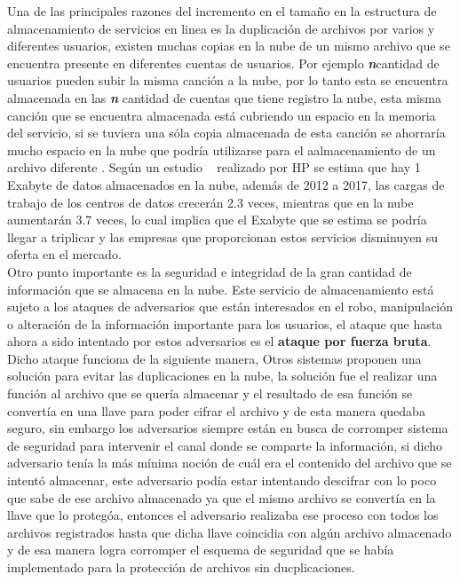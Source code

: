 Una de las principales razones del incremento en el tamaño en la estructura de almacenamiento de servicios en linea es la duplicación de archivos por varios y diferentes usuarios, existen muchas copias en la nube de un mismo archivo que se encuentra presente en diferentes cuentas de usuarios. Por ejemplo \textbf{\textit{n}}cantidad de  usuarios pueden subir la misma canción a la nube, por lo tanto esta se encuentra almacenada en las \textbf{\textit{n}} cantidad de cuentas que tiene registro la nube, esta misma canción que se encuentra almacenada está cubriendo un espacio en la memoria del servicio, si se tuviera una sóla copia almacenada de esta canción se ahorraría mucho espacio en la nube que podría utilizarse para el aalmacenamiento de un archivo diferente . Según un estudio ~\cite{popa} realizado por HP se estima que hay 1 Exabyte de datos almacenados en la nube, además de 2012 a 2017, las cargas de trabajo de los centros de datos crecerán 2.3 veces, mientras que en la nube aumentarán 3.7 veces, lo cual implica que el Exabyte que se estima se podría llegar a triplicar y las empresas que proporcionan estos servicios disminuyen su oferta en el mercado. 
\\ 
Otro punto importante es la seguridad e integridad de la gran cantidad de información que se almacena en la nube.  Este servicio de almacenamiento está sujeto a los ataques de adversarios que están interesados en el robo, manipulación o alteración de la información importante para los usuarios, el ataque que hasta ahora a sido intentado por estos adversarios es el \textbf{ataque por fuerza bruta}. Dicho ataque funciona de la siguiente manera, Otros sistemas proponen una solución para evitar las duplicaciones en la nube, la solución fue el realizar una función al archivo que se quería almacenar y el resultado de esa función se convertía en una llave para poder cifrar el archivo y de esta manera quedaba seguro, sin embargo los adversarios siempre están en busca de corromper sistema de seguridad para intervenir el canal donde se comparte la información, si dicho adversario tenía la más mínima noción de cuál era el contenido del archivo que se intentó almacenar, este adversario podía estar intentando descifrar con lo poco que sabe de ese archivo almacenado  ya que el mismo archivo se convertía en la llave que lo protegóa, entonces el adversario realizaba ese proceso con todos los archivos registrados hasta que dicha llave coincidia con algún archivo almacenado y de esa manera logra corromper el esquema de seguridad que se había implementado para la protección de archivos sin ducplicaciones. 
 

